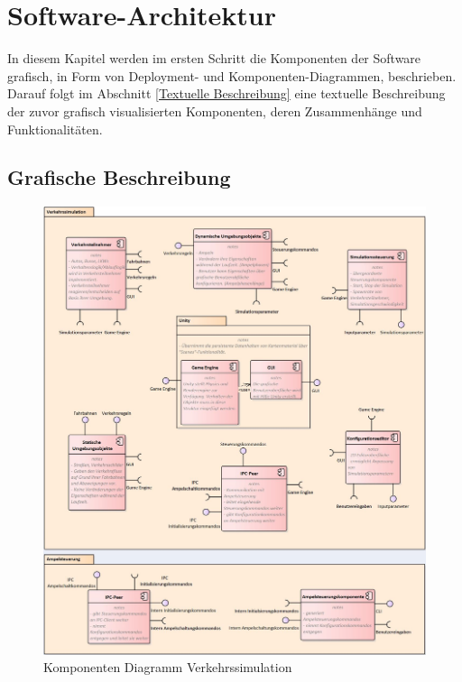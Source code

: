 \chapter{Software-Architektur}
\label{Software-Architektur}

In diesem Kapitel werden im ersten Schritt die Komponenten der Software grafisch, in Form von Deployment- und Komponenten-Diagrammen, beschrieben. Darauf folgt im Abschnitt \ref{Textuelle Beschreibung} eine textuelle Beschreibung der zuvor grafisch visualisierten Komponenten, deren Zusammenhänge und Funktionalitäten.

\thispagestyle{standard}
\pagestyle{standard}

\section{Grafische Beschreibung}
\label{Grafische Beschreibung}

\begin{figure}[H]
\begin{center}
	\includegraphics[scale=0.673]{BilderAllgemein/Komponentdiagram.JPG}
\end{center}
	\caption{Komponenten Diagramm Verkehrssimulation}
\end{figure}

